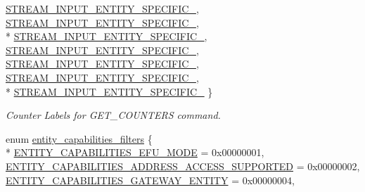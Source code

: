 \begin{DoxyCompactItemize}
\hyperlink{namespaceavdecc__lib_a831be56dba8ac423258a9374a1202df4a00b79f026bd6194430acf660835ba4f3}{S\+T\+R\+E\+A\+M\+\_\+\+I\+N\+P\+U\+T\+\_\+\+E\+N\+T\+I\+T\+Y\+\_\+\+S\+P\+E\+C\+I\+F\+I\+C\+\_}, 
\hyperlink{namespaceavdecc__lib_a831be56dba8ac423258a9374a1202df4a85e4e640369c04420e59945c76e7f9e0}{S\+T\+R\+E\+A\+M\+\_\+\+I\+N\+P\+U\+T\+\_\+\+E\+N\+T\+I\+T\+Y\+\_\+\+S\+P\+E\+C\+I\+F\+I\+C\+\_}, 
\\*
\hyperlink{namespaceavdecc__lib_a831be56dba8ac423258a9374a1202df4a9722e76b14e5a115a8f15b0b1a347b7e}{S\+T\+R\+E\+A\+M\+\_\+\+I\+N\+P\+U\+T\+\_\+\+E\+N\+T\+I\+T\+Y\+\_\+\+S\+P\+E\+C\+I\+F\+I\+C\+\_}, 
\hyperlink{namespaceavdecc__lib_a831be56dba8ac423258a9374a1202df4a55f2b754af686136b0b21eef046a8cbb}{S\+T\+R\+E\+A\+M\+\_\+\+I\+N\+P\+U\+T\+\_\+\+E\+N\+T\+I\+T\+Y\+\_\+\+S\+P\+E\+C\+I\+F\+I\+C\+\_}, 
\hyperlink{namespaceavdecc__lib_a831be56dba8ac423258a9374a1202df4ae705273034778f799b78f345761f026e}{S\+T\+R\+E\+A\+M\+\_\+\+I\+N\+P\+U\+T\+\_\+\+E\+N\+T\+I\+T\+Y\+\_\+\+S\+P\+E\+C\+I\+F\+I\+C\+\_}, 
\hyperlink{namespaceavdecc__lib_a831be56dba8ac423258a9374a1202df4a48b78e995930a1f50984dcf881252401}{S\+T\+R\+E\+A\+M\+\_\+\+I\+N\+P\+U\+T\+\_\+\+E\+N\+T\+I\+T\+Y\+\_\+\+S\+P\+E\+C\+I\+F\+I\+C\+\_}, 
\\*
\hyperlink{namespaceavdecc__lib_a831be56dba8ac423258a9374a1202df4a82aa7f5ee91a6750481bd25326a080dc}{S\+T\+R\+E\+A\+M\+\_\+\+I\+N\+P\+U\+T\+\_\+\+E\+N\+T\+I\+T\+Y\+\_\+\+S\+P\+E\+C\+I\+F\+I\+C\+\_}
 \}\begin{DoxyCompactList}\small\item\em Counter Labels for G\+E\+T\+\_\+\+C\+O\+U\+N\+T\+E\+RS command. \end{DoxyCompactList}
\item 
enum \hyperlink{namespaceavdecc__lib_a7904f1f7ce9b1358c7158a9dffc7319d}{entity\+\_\+capabilities\+\_\+filters} \{ \\*
\hyperlink{namespaceavdecc__lib_a7904f1f7ce9b1358c7158a9dffc7319da46364e5a701fc34a2af9dfd561ed3aec}{E\+N\+T\+I\+T\+Y\+\_\+\+C\+A\+P\+A\+B\+I\+L\+I\+T\+I\+E\+S\+\_\+\+E\+F\+U\+\_\+\+M\+O\+DE} = 0x00000001, 
\hyperlink{namespaceavdecc__lib_a7904f1f7ce9b1358c7158a9dffc7319dab5acf61358793027960465285c31dc82}{E\+N\+T\+I\+T\+Y\+\_\+\+C\+A\+P\+A\+B\+I\+L\+I\+T\+I\+E\+S\+\_\+\+A\+D\+D\+R\+E\+S\+S\+\_\+\+A\+C\+C\+E\+S\+S\+\_\+\+S\+U\+P\+P\+O\+R\+T\+ED} = 0x00000002, 
\hyperlink{namespaceavdecc__lib_a7904f1f7ce9b1358c7158a9dffc7319daf02446d7857131e494d0acbf346abaec}{E\+N\+T\+I\+T\+Y\+\_\+\+C\+A\+P\+A\+B\+I\+L\+I\+T\+I\+E\+S\+\_\+\+G\+A\+T\+E\+W\+A\+Y\+\_\+\+E\+N\+T\+I\+TY} = 0x00000004, 

\end{DoxyCompactItemize}
